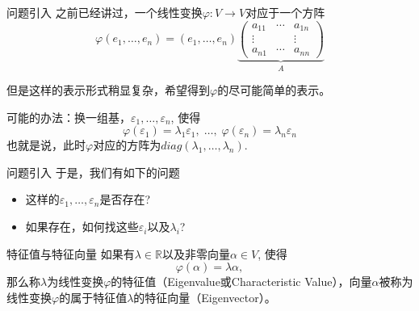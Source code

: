 \begin{frame}

\begin{block}{问题引入}
之前已经讲过，一个线性变换$\varphi: V \to V$对应于一个方阵
\[\varphi(e_1, \ldots, e_n) = (e_1, \ldots, e_n) \underbrace{\begin{pmatrix}
a_{11} & \cdots & a_{1n} \\ \vdots & & \vdots \\ a_{n1} & \cdots & a_{nn} \end{pmatrix}}_{A}\]

\pause

但是这样的表示形式稍显复杂，希望得到$\varphi$的尽可能简单的表示。

\pause

可能的办法：换一组基，$\varepsilon_1, \ldots, \varepsilon_n$, 使得
\[\varphi(\varepsilon_1) = \lambda_1 \varepsilon_1, \; \ldots, \; \varphi(\varepsilon_n) = \lambda_n\varepsilon_n\]
也就是说，此时$\varphi$对应的方阵为$diag(\lambda_1 , \ldots, \lambda_n)$.
\end{block}

\end{frame}


\begin{frame}

\begin{block}{问题引入}
\vspace{1em}
于是，我们有如下的问题
\vspace{2em}
\begin{itemize}
\item<2-> 这样的$\varepsilon_1,\ldots,\varepsilon_n$是否存在?
\vspace{1em}
\item<3-> 如果存在，如何找这些$\varepsilon_i$以及$\lambda_i$?
\end{itemize}
\end{block}

\end{frame}


\begin{frame}

\begin{block}{特征值与特征向量}
如果有$\lambda \in \mathbb{R}$以及{\color{red}非零向量}$\alpha \in V$, 使得
\[\varphi(\alpha) = \lambda \alpha,\]
那么称$\lambda$为线性变换$\varphi$的特征值（Eigenvalue或Characteristic Value），向量$\alpha$被称为线性变换$\varphi$的属于特征值$\lambda$的特征向量（Eigenvector）。
\end{block}

\end{frame}

